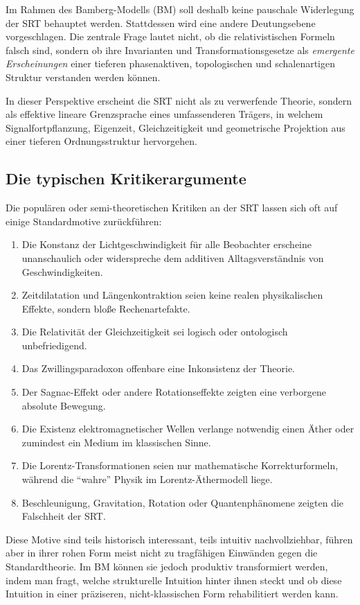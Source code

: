 \documentclass[12pt,a4paper]{article}
\begin{document}
	Im Rahmen des Bamberg-Modells (BM) soll deshalb keine pauschale Widerlegung der SRT behauptet werden. Stattdessen wird eine andere Deutungsebene vorgeschlagen. Die zentrale Frage lautet nicht, ob die relativistischen Formeln falsch sind, sondern ob ihre Invarianten und Transformationsgesetze als \emph{emergente Erscheinungen} einer tieferen phasenaktiven, topologischen und schalenartigen Struktur verstanden werden können.
	
	In dieser Perspektive erscheint die SRT nicht als zu verwerfende Theorie, sondern als effektive lineare Grenzsprache eines umfassenderen Trägers, in welchem Signalfortpflanzung, Eigenzeit, Gleichzeitigkeit und geometrische Projektion aus einer tieferen Ordnungsstruktur hervorgehen.
	
	\subsection{Die typischen Kritikerargumente}
	
	Die populären oder semi-theoretischen Kritiken an der SRT lassen sich oft auf einige Standardmotive zurückführen:
	
	\begin{enumerate}
		\item Die Konstanz der Lichtgeschwindigkeit für alle Beobachter erscheine unanschaulich oder widerspreche dem additiven Alltagsverständnis von Geschwindigkeiten.
		\item Zeitdilatation und Längenkontraktion seien keine realen physikalischen Effekte, sondern bloße Rechenartefakte.
		\item Die Relativität der Gleichzeitigkeit sei logisch oder ontologisch unbefriedigend.
		\item Das Zwillingsparadoxon offenbare eine Inkonsistenz der Theorie.
		\item Der Sagnac-Effekt oder andere Rotationseffekte zeigten eine verborgene absolute Bewegung.
		\item Die Existenz elektromagnetischer Wellen verlange notwendig einen Äther oder zumindest ein Medium im klassischen Sinne.
		\item Die Lorentz-Transformationen seien nur mathematische Korrekturformeln, während die ``wahre'' Physik im Lorentz-Äthermodell liege.
		\item Beschleunigung, Gravitation, Rotation oder Quantenphänomene zeigten die Falschheit der SRT.
	\end{enumerate}
	
	Diese Motive sind teils historisch interessant, teils intuitiv nachvollziehbar, führen aber in ihrer rohen Form meist nicht zu tragfähigen Einwänden gegen die Standardtheorie. Im BM können sie jedoch produktiv transformiert werden, indem man fragt, welche strukturelle Intuition hinter ihnen steckt und ob diese Intuition in einer präziseren, nicht-klassischen Form rehabilitiert werden kann.
	
\end{document}
